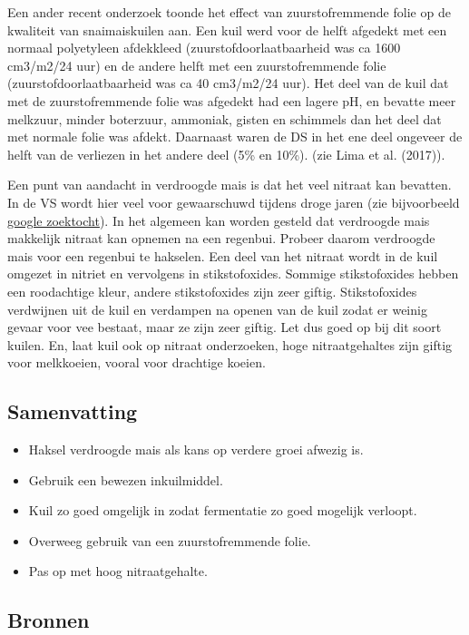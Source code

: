 \documentclass[]{article}
\providecommand{\tightlist}{%
  \setlength{\itemsep}{0pt}\setlength{\parskip}{0pt}}
\begin{document}
Een ander recent onderzoek toonde het effect van zuurstofremmende folie
op de kwaliteit van snaimaiskuilen aan. Een kuil werd voor de helft
afgedekt met een normaal polyetyleen afdekkleed
(zuurstofdoorlaatbaarheid was ca 1600 cm3/m2/24 uur) en de andere helft
met een zuurstofremmende folie (zuurstofdoorlaatbaarheid was ca 40
cm3/m2/24 uur). Het deel van de kuil dat met de zuurstofremmende folie
was afgedekt had een lagere pH, en bevatte meer melkzuur, minder
boterzuur, ammoniak, gisten en schimmels dan het deel dat met normale
folie was afdekt. Daarnaast waren de DS in het ene deel ongeveer de
helft van de verliezen in het andere deel (5\% en 10\%). (zie Lima et
al. (2017)).

Een punt van aandacht in verdroogde mais is dat het veel nitraat kan
bevatten. In de VS wordt hier veel voor gewaarschuwd tijdens droge jaren
(zie bijvoorbeeld
\href{https://www.google.com/search?q=drought+stressed+corn+silage}{google
zoektocht}). In het algemeen kan worden gesteld dat verdroogde mais
makkelijk nitraat kan opnemen na een regenbui. Probeer daarom verdroogde
mais voor een regenbui te hakselen. Een deel van het nitraat wordt in de
kuil omgezet in nitriet en vervolgens in stikstofoxides. Sommige
stikstofoxides hebben een roodachtige kleur, andere stikstofoxides zijn
zeer giftig. Stikstofoxides verdwijnen uit de kuil en verdampen na
openen van de kuil zodat er weinig gevaar voor vee bestaat, maar ze zijn
zeer giftig. Let dus goed op bij dit soort kuilen. En, laat kuil ook op
nitraat onderzoeken, hoge nitraatgehaltes zijn giftig voor melkkoeien,
vooral voor drachtige koeien.

\hypertarget{samenvatting}{%
\subsection{Samenvatting}\label{samenvatting}}

\begin{itemize}
\tightlist
\item
  Haksel verdroogde mais als kans op verdere groei afwezig is.
\item
  Gebruik een bewezen inkuilmiddel.
\item
  Kuil zo goed omgelijk in zodat fermentatie zo goed mogelijk verloopt.
\item
  Overweeg gebruik van een zuurstofremmende folie.
\item
  Pas op met hoog nitraatgehalte.
\end{itemize}

\hypertarget{bronnen}{%
\subsection*{Bronnen}\label{bronnen}}
\end{document}
